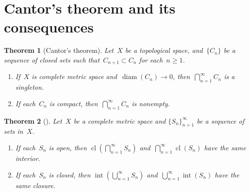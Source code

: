 \documentclass[11pt,a4paper]{article}  %
\newtheorem{theorem}{Theorem}[section]
\theoremstyle{definition}
\newcommand{\diam}{\operatorname{diam}}
\DeclareMathOperator{\inter}{int}
\DeclareMathOperator{\cl}{cl}
\numberwithin{equation}{section}
\begin{document}
\section{Cantor's theorem and its consequences}

\begin{theorem}[Cantor's theorem]
  \label{th:cantor}
  Let~$X$ be a topological space, and~$\{C_n\}$ be a sequence of
  closed sets such that~$C_{n+1}\subset C_n$ for each~$n\ge 1$.
\begin{enumerate}
  \item If~$X$ is complete metric space and~$\diam(C_n)\to 0$, then~$\bigcap_{n=1}^\infty C_n$ is
    a singleton.
  \item If each~$C_n$ is compact, then~$\bigcap_{n=1}^\infty C_n$ is nonempty.
\end{enumerate}
\end{theorem}


\begin{theorem}[{\cite[Theorems~1.4.5--1.4.6]{Zalinescu_2002}}]
  \label{th:intclcm}
  Let~$X$ be a complete metric space and $\{S_n\}_{n=1}^\infty$ be a sequence of sets in~$X$.
  \begin{enumerate}
    \item If each~$S_n$ is open, then $\cl(\bigcap_{n=1}^\infty S_n)$ and~$\bigcap_{n=1}^\infty \cl(S_n)$ have the same interior.
    \item If each~$S_n$ is closed, then $\inter(\bigcup_{n=1}^\infty S_n)$ and~$\bigcup_{n=1}^\infty \inter(S_n)$ have the same closure.
  \end{enumerate}
\end{theorem}
\end{document}
